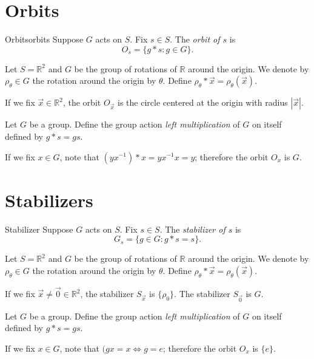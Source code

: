 \section{Orbits}

\begin{defn}{Orbits}{orbits}
  Suppose \(G\) acts on \(S\). Fix \(s \in S\). The \emph{orbit of \(s\)} is
  \[
    O_s = \{g * s : g \in G\}.
  \] 
\end{defn}

\begin{exmp}{}{}
  Let \(S = \mathbb{R}^2\) and \(G\) be the group of rotations of \(\mathbb{R}\) around the origin.
  We denote by \(\rho_\theta \in G\) the rotation around the origin by \(\theta\).
  Define \(\rho_\theta * \vec x = \rho_\theta(\vec x)\).

  If we fix \(\vec x \in \mathbb{R}^2\), the orbit \(O_{\vec x}\) is the circle centered at the origin with radius  \(\left|\vec x\right|\).
\end{exmp}

\begin{exmp}{}{}
	Let \(G\) be a group. Define the group action \emph{left multiplication} of \(G\) on itself defined by \(g * s = gs\).

    If we fix \(x \in G\), note that \((yx^{-1})*x=yx^{-1}x=y\); therefore the orbit \(O_x\) is \(G\).
\end{exmp}

\section{Stabilizers}

\begin{defn}{Stabilizer}{}
  Suppose \(G\) acts on \(S\). Fix \(s \in S\). The \emph{stabilizer of \(s\)} is
  \[
    G_s = \{g \in G : g * s = s\}.
  \] 
\end{defn}

\begin{exmp}{}{}
  Let \(S = \mathbb{R}^2\) and \(G\) be the group of rotations of \(\mathbb{R}\) around the origin.
  We denote by \(\rho_\theta \in G\) the rotation around the origin by \(\theta\).
  Define \(\rho_\theta * \vec x = \rho_\theta(\vec x)\).

  If we fix \(\vec x \neq \vec 0 \in \mathbb{R}^2\), the stabilizer \(S_{\vec x}\) is \(\{\rho_0\}\).
  The stabilizer \(S_{\vec 0}\) is \(G\).
\end{exmp}

\begin{exmp}{}{}
	Let \(G\) be a group. Define the group action \emph{left multiplication} of \(G\) on itself defined by \(g * s = gs\).

    If we fix \(x \in G\), note that \((gx=x \iff g=e\); therefore the orbit \(O_x\) is \(\{e\}\).
\end{exmp}


